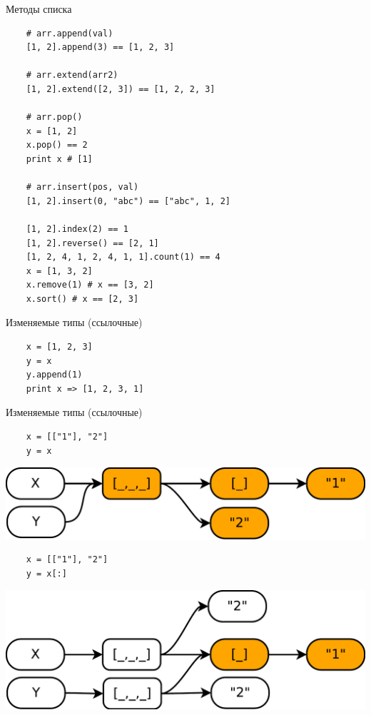 \documentclass{article}
\begin{document}
\begin{center} Методы списка \end{center}
\Large{
\vspace{15pt}
\begin{lstlisting}
	# arr.append(val)
	[1, 2].append(3) == [1, 2, 3]

	# arr.extend(arr2)
	[1, 2].extend([2, 3]) == [1, 2, 2, 3]

	# arr.pop()
	x = [1, 2]
	x.pop() == 2
	print x # [1]

	# arr.insert(pos, val)
	[1, 2].insert(0, "abc") == ["abc", 1, 2]

	[1, 2].index(2) == 1
	[1, 2].reverse() == [2, 1]
	[1, 2, 4, 1, 2, 4, 1, 1].count(1) == 4
	x = [1, 3, 2]
	x.remove(1) # x == [3, 2]
	x.sort() # x == [2, 3]
\end{lstlisting}
}
\newpage

\begin{center} Изменяемые типы (ссылочные) \end{center}
\vspace{15pt}
\begin{lstlisting}
	x = [1, 2, 3]
	y = x
	y.append(1)
	print x => [1, 2, 3, 1]
\end{lstlisting}
\newpage

\begin{center} Изменяемые типы (ссылочные) \end{center}
\vspace{15pt}
\begin{lstlisting}
	x = [["1"], "2"]
	y = x
\end{lstlisting}
\includegraphics[scale=0.6]{images/refs_1.pdf}

\vspace{15pt}
\begin{lstlisting}
	x = [["1"], "2"]
	y = x[:]
\end{lstlisting}
\includegraphics[scale=0.6]{images/refs_2.pdf}
\end{document}
